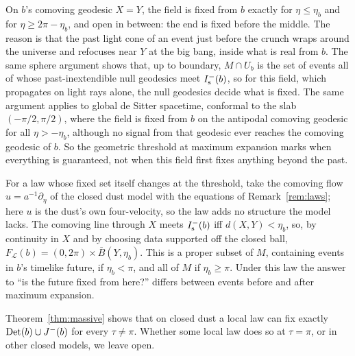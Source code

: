 On $b$'s comoving geodesic $X=Y$, the field is fixed from $b$ exactly for
$\eta\le\eta_b$ and for $\eta\ge2\pi-\eta_b$, and open in between: the end is
fixed before the middle. The reason is that the past light cone of an event
just before the crunch wraps around the universe and refocuses near $Y$ at the
big bang, inside what is real from $b$. The same sphere argument shows that,
up to boundary, $M\cap U_b$ is the set
of events all of whose past-inextendible null geodesics meet $I^-_{\mathrm s}(b)$, so for
this field, which propagates on light rays alone, the null geodesics decide
what is fixed. The same argument applies to global de Sitter spacetime,
conformal to the slab $(-\pi/2,\pi/2)$, where the field is fixed from $b$ on the
antipodal comoving geodesic for all $\eta>-\eta_b$, although no signal from that
geodesic ever reaches the comoving geodesic of $b$. So the geometric threshold
at maximum expansion marks when everything is guaranteed, not when this field
first fixes anything beyond the past.

For a law whose fixed set itself changes at the threshold, take the comoving
flow $u=a^{-1}\partial_\eta$ of the closed dust model with the equations of
Remark~\ref{rem:laws}; here $u$ is the dust's own four-velocity, so the law
adds no structure the model lacks. The comoving line through $X$ meets $I^-_{\mathrm s}(b)$ iff
$d(X,Y)<\eta_b$, so, by continuity in $X$ and by choosing data supported off
the closed ball, $F_{\mathcal L}(b)=(0,2\pi)\times\bar B(Y,\eta_b)$. This is a
proper subset of $M$, containing events in $b$'s timelike future, if
$\eta_b<\pi$, and all of $M$ if $\eta_b\ge\pi$. Under this law the answer to
``is the future fixed from here?'' differs between events before and after
maximum expansion.

Theorem~\ref{thm:massive} shows that on closed dust a local law can fix exactly
$\mathrm{Det}(b)\cup J^-(b)$ for every $\tau\neq\pi$. Whether some local law does so at
$\tau=\pi$, or in other closed models, we leave open.
